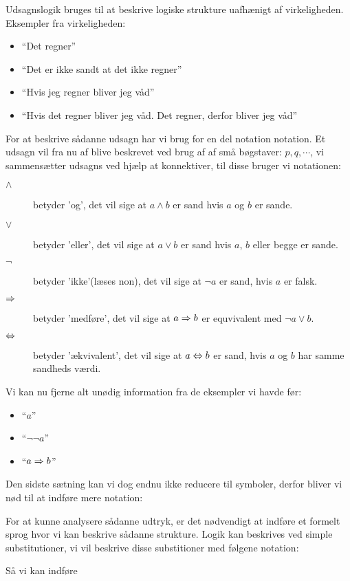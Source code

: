 Udsagnslogik bruges til at beskrive logiske strukture uafhænigt af virkeligheden.
Eksempler fra virkeligheden:
\begin{itemize}
    \item ``Det regner''
    \item ``Det er ikke sandt at det ikke regner''
    \item ``Hvis jeg regner bliver jeg våd''
    \item ``Hvis det regner bliver jeg våd. Det regner, derfor bliver jeg våd''
\end{itemize}

For at beskrive sådanne udsagn har vi brug for en del notation notation. Et udsagn vil fra nu af blive beskrevet ved brug af af små bøgstaver: $p, q, \cdots$,
vi sammensætter udsagns ved hjælp at konnektiver, til disse bruger vi notationen:

\begin{description}
    \item[$\land$] betyder 'og', det vil sige at $a \land b$ er sand hvis $a$ og $b$ er sande.
    \item[$\lor$] betyder 'eller', det vil sige at $a \lor b$ er sand hvis $a$, $b$ eller begge er sande.
    \item[$\lnot$] betyder 'ikke'(læses non), det vil sige at $\lnot a$ er sand, hvis $a$ er falsk.
    \item[$\imp$] betyder 'medføre', det vil sige at $a \imp b$ er equvivalent med $\lnot a \lor b$.
    \item[$\bimp$] betyder 'ækvivalent', det vil sige at $a \bimp b$ er sand, hvis $a$ og $b$ har samme sandheds værdi.
\end{description}

Vi kan nu fjerne alt unødig information fra de eksempler vi havde før:
\begin{itemize}
    \item ``$a$''
    \item ``$\lnot \lnot a$''
    \item ``$a \imp b$''
\end{itemize}

Den sidste sætning kan vi dog endnu ikke reducere til symboler, derfor bliver vi nød til at indføre mere notation:

\begin{prooftree}
\end{prooftree}

For at kunne analysere sådanne udtryk, er det nødvendigt at indføre et formelt sprog hvor vi kan beskrive sådanne strukture.
Logik kan beskrives ved simple substitutioner,  vi vil beskrive disse substitioner med følgene notation:

Så vi kan indføre
